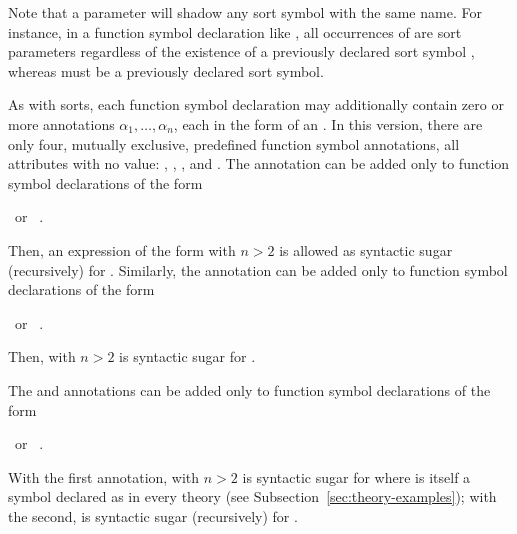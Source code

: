 Note that a parameter will shadow any sort symbol with the same name.
For instance, in a function symbol declaration like
,
all occurrences of  are sort parameters regardless of the existence
of a previously declared sort symbol , whereas  must
be a previously declared sort symbol.

As with sorts, each function symbol declaration 
may additionally contain zero or more annotations $\alpha_1, \ldots, \alpha_n$,
each in the form of an .
In this version, there are only four, mutually exclusive, predefined function symbol annotations,
all attributes with no value:
, 
,
,
and
. 
The  annotation can be added only 
to function symbol declarations of the form
\begin{center}
\ or \ 
.
\end{center}
Then, an expression of the form  
with $n > 2$ is allowed as syntactic sugar (recursively) for
.
Similarly,
the  annotation can be added only 
to function symbol declarations of the form
\begin{center}
\ or \ 
.
\end{center}
Then, \expr{($f$ $t_1\ \cdots\ t_n$)} with $n > 2$ is syntactic sugar for
.

The  and  annotations can be added only 
to function symbol declarations of the form
\begin{center}
\ or \ 
.
\end{center}
With the first annotation, 
\expr{($f$ $t_1\ \cdots\ t_n$)} with $n > 2$ is syntactic sugar for
where \ter{and} is itself a symbol declared as 
in every theory (see Subsection~\ref{sec:theory-examples});
with the second, \expr{($f$ $t_1\ \cdots\ t_n$)} is syntactic sugar 
(recursively) for
. 
\medskip


